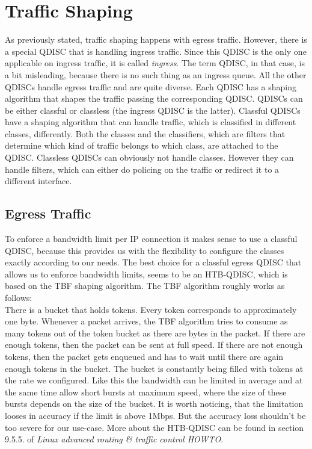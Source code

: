 \section{Traffic Shaping}\label{Traffic Shaping}
As previously stated, traffic shaping happens with egress traffic. However, there is a special \acs{QDISC} that is handling ingress traffic. Since this \acs{QDISC} is the only one applicable on ingress traffic, it is called \textit{ingress}. The term \acl{QDISC}, in that case, is a bit misleading, because there is no such thing as an ingress queue. All the other \acsp{QDISC} handle egress traffic and are quite diverse. Each \acs{QDISC} has a shaping algorithm that shapes the traffic passing the corresponding \acs{QDISC}. \acsp{QDISC} can be either classful or classless (the ingress \acs{QDISC} is the latter). Classful \acsp{QDISC} have a shaping algorithm that can handle traffic, which is classified in different classes, differently. Both the classes and the classifiers, which are filters that determine which kind of traffic belongs to which class, are attached to the \acs{QDISC}. Classless \acsp{QDISC} can obviously not handle classes. However they can handle filters, which can either do policing on the traffic or  redirect it to a different interface.

\subsection{Egress Traffic}
To enforce a bandwidth limit per \acs{IP} connection it makes sense to use a classful \acs{QDISC}, because this provides us with the flexibility to configure the classes exactly according to our needs. The best choice for a classful egress \acs{QDISC} that allows us to enforce bandwidth limits, seems to be an \ac{HTB}-\acs{QDISC}, which is based on the \ac{TBF} shaping algorithm. The \acs{TBF} algorithm roughly works as follows: 
\\There is a bucket that holds tokens. Every token corresponds to approximately one byte. Whenever a packet arrives, the \acs{TBF} algorithm tries to consume as many tokens out of the token bucket as there are bytes in the packet. If there are enough tokens, then the packet can be sent at full speed. If there are not enough tokens, then the packet gets enqueued and has to wait until there are again enough tokens in the bucket. The bucket is constantly being filled with tokens at the rate we configured. Like this the bandwidth can be limited in average and at the same time allow short bursts at maximum speed, where the size of these bursts depends on the size of the bucket. It is worth noticing, that the limitation looses in accuracy if the limit is above 1Mbps. But the accuracy loss shouldn't be too severe for our use-case.
More about the \acs{HTB}-\acs{QDISC} can be found in section 9.5.5. of \textit{Linux advanced routing \& traffic control HOWTO}\cite{hubert2002linux}.

